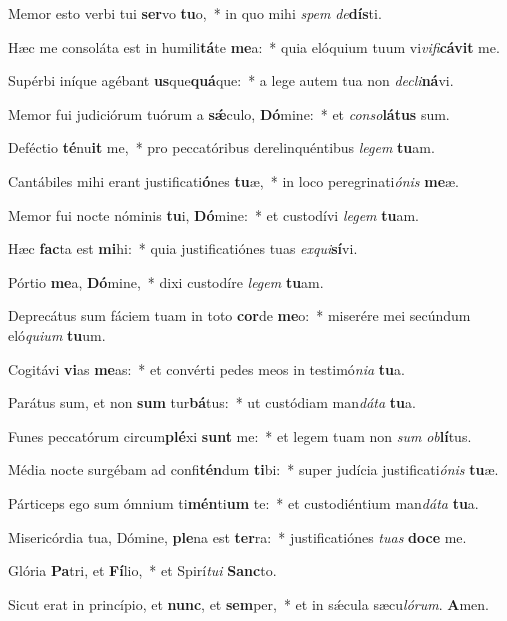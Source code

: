 ﻿\item Memor esto verbi tui \textbf{ser}vo \textbf{tu}o,~* in quo mihi \emph{spem} \emph{de}\textbf{dís}ti.
\item Hæc me consoláta est in humili\textbf{tá}te \textbf{me}a:~* quia elóquium tuum vi\emph{vi}\emph{fi}\textbf{cá}\textbf{vit} me.
\item Supérbi iníque agébant \textbf{us}que\textbf{quá}que:~* a lege autem tua non \emph{de}\emph{cli}\textbf{ná}vi.
\item Memor fui judiciórum tuórum a \textbf{sǽ}culo, \textbf{Dó}mine:~* et \emph{con}\emph{so}\textbf{lá}\textbf{tus} sum.
\item Deféctio \textbf{té}nu\textbf{it} me,~* pro peccatóribus derelinquéntibus \emph{le}\emph{gem} \textbf{tu}am.
\item Cantábiles mihi erant justificati\textbf{ó}nes \textbf{tu}æ,~* in loco peregrinati\emph{ó}\emph{nis} \textbf{me}æ.
\item Memor fui nocte nóminis \textbf{tu}i, \textbf{Dó}mine:~* et custodívi \emph{le}\emph{gem} \textbf{tu}am.
\item Hæc \textbf{fac}ta est \textbf{mi}hi:~* quia justificatiónes tuas \emph{ex}\emph{qui}\textbf{sí}vi.
\item Pórtio \textbf{me}a, \textbf{Dó}mine,~* dixi custodíre \emph{le}\emph{gem} \textbf{tu}am.
\item Deprecátus sum fáciem tuam in toto \textbf{cor}de \textbf{me}o:~* miserére mei secúndum eló\emph{qui}\emph{um} \textbf{tu}um.
\item Cogitávi \textbf{vi}as \textbf{me}as:~* et convérti pedes meos in testimó\emph{ni}\emph{a} \textbf{tu}a.
\item Parátus sum, et non \textbf{sum} tur\textbf{bá}tus:~* ut custódiam man\emph{dá}\emph{ta} \textbf{tu}a.
\item Funes peccatórum circum\textbf{plé}xi \textbf{sunt} me:~* et legem tuam non \emph{sum} \emph{ob}\textbf{lí}tus.
\item Média nocte surgébam ad confi\textbf{tén}dum \textbf{ti}bi:~* super judícia justificati\emph{ó}\emph{nis} \textbf{tu}æ.
\item Párticeps ego sum ómnium ti\textbf{mén}ti\textbf{um} te:~* et custodiéntium man\emph{dá}\emph{ta} \textbf{tu}a.
\item Misericórdia tua, Dómine, \textbf{ple}na est \textbf{ter}ra:~* justificatiónes \emph{tu}\emph{as} \textbf{do}\textbf{ce} me.
\item Glória \textbf{Pa}tri, et \textbf{Fí}lio,~* et Spirí\emph{tu}\emph{i} \textbf{Sanc}to.
\item Sicut erat in princípio, et \textbf{nunc}, et \textbf{sem}per,~* et in sǽcula sæcu\emph{ló}\emph{rum}. \textbf{A}men.